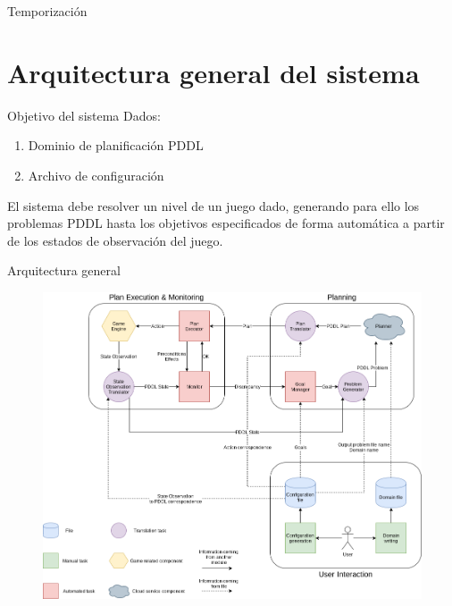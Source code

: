 \documentclass[11pt]{beamer}    %
\begin{document}
    \begin{frame}{Temporización}
        \begin{figure}
            \centering
            \scalebox{0.36}{
                
            }
        \end{figure}
    \end{frame}

    \section{Arquitectura general del sistema}

    \begin{frame}{Objetivo del sistema}
        Dados:

        \begin{enumerate}
            \item Dominio de planificación PDDL
            \item Archivo de configuración
        \end{enumerate}

        El sistema debe resolver un nivel de un juego dado, generando para ello los problemas PDDL
        hasta los objetivos especificados \alert{de forma automática} a partir de los estados de
        observación del juego.
    \end{frame}

    \begin{frame}{Arquitectura general}
        \begin{figure}
            \centering
            \includegraphics[scale=0.25]{img/presentation/system_arch}
        \end{figure}
    \end{frame}
\end{document}
